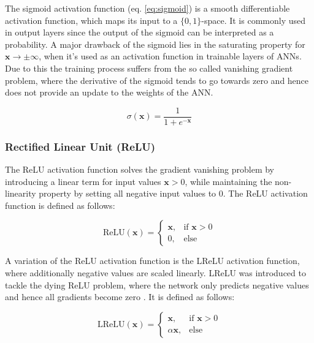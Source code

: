 The sigmoid activation function (eq. \ref{eq:sigmoid}) is a smooth differentiable activation function, which maps its input to a $\{0, 1\}$-space.
It is commonly used in output layers since the output of the sigmoid can be interpreted as a probability.
A major drawback of the sigmoid lies in the saturating property for $\mathbf{x} \to \pm \infty$, when it's used as an activation function in trainable layers of \acp{ANN}.
Due to this the training process suffers from the so called vanishing gradient problem, where the derivative of the sigmoid tends to go towards zero and hence does not provide an update to the weights of the \ac{ANN}.

\begin{equation}
    \sigma(\mathbf{x}) = \frac{1}{1 + e^{-\mathbf{x}}}
    \label{eq:sigmoid}
\end{equation}

\subsubsection{Rectified Linear Unit (ReLU)}

The \ac{ReLU} activation function solves the gradient vanishing problem by introducing a linear term for input values $\mathbf{x} > 0$, while maintaining the non-linearity property by setting all negative input values to $0$.
The \ac{ReLU} activation function is defined as follows:

\begin{equation}
    \text{ReLU}(\mathbf{x}) =
    \begin{cases}
        \mathbf{x}, & \text{if } \mathbf{x} > 0\\
        0, & \text{else}
    \end{cases}
\end{equation}

A variation of the \ac{ReLU} activation function is the \ac{LReLU} activation function, where additionally negative values are scaled linearly.
\ac{LReLU} was introduced to tackle the dying \ac{ReLU} problem, where the network only predicts negative values and hence all gradients become zero \cite{dl}.
It is defined as follows:

\begin{equation}
    \text{LReLU}(\mathbf{x}) =
    \begin{cases}
        \mathbf{x}, & \text{if } \mathbf{x} > 0\\
        \alpha \mathbf{x}, & \text{else}
    \end{cases}
\end{equation}

